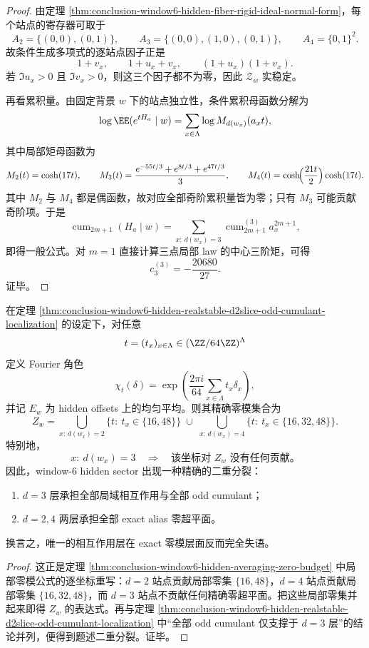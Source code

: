 \begin{proof}
由定理 \ref{thm:conclusion-window6-hidden-fiber-rigid-ideal-normal-form}，每个站点的寄存器可取于
\[
A_2=\{(0,0),(0,1)\},\qquad
A_3=\{(0,0),(1,0),(0,1)\},\qquad
A_4=\{0,1\}^2.
\]
故条件生成多项式的逐站点因子正是
\[
1+v_x,\qquad 1+u_x+v_x,\qquad (1+u_x)(1+v_x).
\]
若 \(\Im u_x>0\) 且 \(\Im v_x>0\)，则这三个因子都不为零，因此 \(\mathscr Z_w\) 实稳定。

再看累积量。由固定背景 \(w\) 下的站点独立性，条件累积母函数分解为
\[
\log \EE(e^{tH_a}\mid w)=\sum_{x\in\Lambda}\log M_{d(w_x)}(a_xt),
\]
其中局部矩母函数为
\[
M_2(t)=\cosh(17t),
\qquad
M_3(t)=\frac{e^{-55t/3}+e^{8t/3}+e^{47t/3}}{3},
\qquad
M_4(t)=\cosh\!\Bigl(\frac{21t}{2}\Bigr)\cosh(17t).
\]
其中 \(M_2\) 与 \(M_4\) 都是偶函数，故对应全部奇阶累积量皆为零；只有 \(M_3\) 可能贡献奇阶项。于是
\[
\operatorname{cum}_{2m+1}(H_a\mid w)
=
\sum_{x:\,d(w_x)=3}\operatorname{cum}_{2m+1}^{(3)}a_x^{2m+1},
\]
即得一般公式。对 \(m=1\) 直接计算三点局部 law 的中心三阶矩，可得
\[
c_3^{(3)}=-\frac{20680}{27}.
\]
证毕。
\end{proof}
\begin{corollary}\label{cor:conclusion-window6-exact-alias-hyperplanes-d3-silent}
在定理 \ref{thm:conclusion-window6-hidden-realstable-d2slice-odd-cumulant-localization} 的设定下，对任意
\[
t=(t_x)_{x\in\Lambda}\in(\ZZ/64\ZZ)^\Lambda
\]
定义 Fourier 角色
\[
\chi_t(\delta)=\exp\!\left(\frac{2\pi i}{64}\sum_{x\in\Lambda}t_x\delta_x\right),
\]
并记 \(E_w\) 为 hidden offsets 上的均匀平均。则其精确零模集合为
\[
Z_w=
\bigcup_{x:\,d(w_x)=2}\{t:\ t_x\in\{16,48\}\}
\;\cup\;
\bigcup_{x:\,d(w_x)=4}\{t:\ t_x\in\{16,32,48\}\}.
\]
特别地，
\[
x:\ d(w_x)=3\quad\Longrightarrow\quad \text{该坐标对 }Z_w\text{ 没有任何贡献。}
\]
因此，window-\(6\) hidden sector 出现一种精确的二重分裂：
\begin{enumerate}
  \item \(d=3\) 层承担全部局域相互作用与全部 odd cumulant；
  \item \(d=2,4\) 两层承担全部 exact alias 零超平面。
\end{enumerate}
换言之，唯一的相互作用层在 exact 零模层面反而完全失语。
\end{corollary}
\begin{proof}
这正是定理 \ref{thm:conclusion-window6-hidden-averaging-zero-budget} 中局部零模公式的逐坐标重写：\(d=2\) 站点贡献局部零集 \(\{16,48\}\)，\(d=4\) 站点贡献局部零集 \(\{16,32,48\}\)，而 \(d=3\) 站点不贡献任何精确零超平面。把这些局部零集并起来即得 \(Z_w\) 的表达式。再与定理 \ref{thm:conclusion-window6-hidden-realstable-d2slice-odd-cumulant-localization} 中“全部 odd cumulant 仅支撑于 \(d=3\) 层”的结论并列，便得到题述二重分裂。证毕。
\end{proof}
